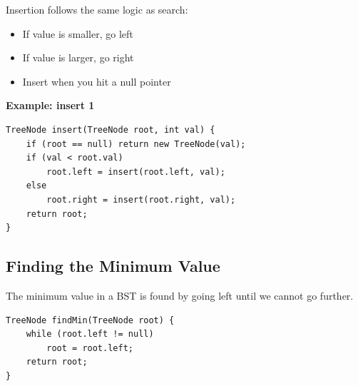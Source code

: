Insertion follows the same logic as search:
\begin{itemize}
  \item If value is smaller, go left
  \item If value is larger, go right
  \item Insert when you hit a null pointer
\end{itemize}

\textbf{Example: insert 1}

\begin{center}
\end{center}

\begin{verbatim}
TreeNode insert(TreeNode root, int val) {
    if (root == null) return new TreeNode(val);
    if (val < root.val)
        root.left = insert(root.left, val);
    else
        root.right = insert(root.right, val);
    return root;
}
\end{verbatim}

\subsection{Finding the Minimum Value}

The minimum value in a BST is found by going left until we cannot go further.

\begin{center}
\end{center}

\begin{verbatim}
TreeNode findMin(TreeNode root) {
    while (root.left != null)
        root = root.left;
    return root;
}
\end{verbatim}
